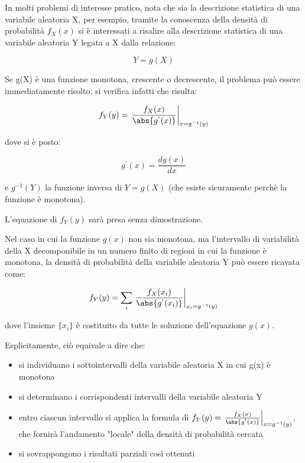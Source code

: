 In molti problemi di interesse pratico, nota che sia la descrizione statistica di una variabile 
aleatoria X, per esempio, tramite la conoscenza della densità di probabilità $f_X(x)$ si è interessati 
a risalire alla descrizione statistica di una variabile aleatoria Y legata a X dalla relazione: 

{
    \Large 
    \begin{equation}
        Y = g(X)
    \end{equation}
}

Se g(X) è una funzione monotona, crescente o decrescente, il problema può essere immediatamente risolto; 
si verifica infatti che risulta: 

{
    \Large 
    \begin{equation}
        f_Y (y) 
        = 
        \left. 
            \frac{f_X (x)}{\abs{g^{'} (x)}}
        \right|_{x = g^{-1} (y)} 
    \end{equation}
}

dove si è posto: 

{
    \Large 
    \begin{equation}
        g^{'} (x) = \frac{d g(x)}{dx}
    \end{equation}
} 

e $g^{-1} (Y)$ la funzione inversa di $ Y = g(X)$ (che esiste sicuramente perchè la funzione è monotona). \newline 

L'equazione di $f_Y (y)$ sarà presa senza dimostrazione. \newline 

Nel caso in cui la funzione $g(x)$ non sia monotona, 
ma l'intervallo di variabilità della X decomponibile in un numero finito di regioni in cui la funzione è monotona, 
la densità di probabilità della variabile aleatoria Y può essere ricavata come: 

{
    \Large 
    \begin{equation}
        f_Y (y) 
        = 
        \sum_{i} 
        \left.
        \frac{f_X (x_i)}{\abs{g^{'} (x_i)}} 
        \right|_{x_i = g^{-1} (y)}
    \end{equation}
}

dove l'insieme $\{x_i\}$ è costituito da tutte le soluzione dell'equazione $g(x)$. \newline 

Esplicitamente, ciò equivale a dire che: 

\begin{itemize}
    \item si individuano i sottointervalli della variabile aleatoria X in cui g(x) è monotona 
    \item si determinano i corrispondenti intervalli della variabile aleatoria Y 
    \item entro ciascun intervallo si applica la formula di $ f_Y (y) 
    = 
    \left. 
        \frac{f_X (x)}{\abs{g^{'} (x)}}
    \right|_{x = g^{-1} (y)}$, che fornirà l'andamento "locale" della densità di probabilità cercata 

    \item si sovrappongono i risultati parziali così ottenuti


\end{itemize}

